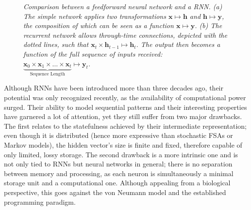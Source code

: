 \documentclass[]{article}
\begin{document}
\begin{figure}
\begin{minipage}{0.5\textwidth}
	\end{minipage}
	\caption[]
	{\small \textit{Comparison between a feedforward neural network and a RNN. (a) The simple network applies two transformations $\pmb{x} \mapsto \pmb{h}$ and $\pmb{h} \mapsto \pmb{y}$, the composition of which can be seen as a function $\pmb{x} \mapsto \pmb{y}$. (b) The recurrent network allows through-time connections, depicted with the dotted lines, such that $\pmb{x}_t \times \pmb{h}_{t-1} \mapsto \pmb{h}_t$. The output then becomes a function of the full sequence of inputs received: $\underbrace{\pmb{x}_0 \times \pmb{x}_1 \times \dots \times \pmb{x}_t}_{\text{Sequence Length}} \mapsto \pmb{y}_t$.}\label{fig:1}}
\end{figure}

Although RNNs have been introduced more than three decades ago, their potential was only recognized recently, as the availability of computational power surged. Their ability to model sequential patterns and their interesting properties have garnered a lot of attention, yet they still suffer from two major drawbacks. The first relates to the statefulness achieved by their intermediate representation; even though it is distributed (hence more expressive than stochastic FSAs or Markov models)\cite[Lecture~10]{Hinton13}, the hidden vector's size is finite and fixed, therefore capable of only limited, lossy storage. The second drawback is a more intrinsic one and is not only tied to RNNs but neural networks in general; there is no separation between memory and processing, as each neuron is simultaneously a minimal storage unit and a computational one. Although appealing from a biological perspective, this goes against the von Neumann model and the established programming paradigm. 
\end{document}
